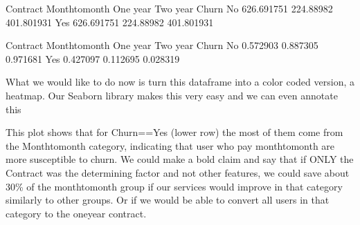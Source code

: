 \documentclass[letterpaper,10pt,english]{jupyterBook}
\begin{document}
\begin{sphinxVerbatim}[commandchars=\\\{\}]
Contract  Month\PYGZhy{}to\PYGZhy{}month   One year    Two year
Churn                                          
No           \PYGZhy{}626.691751  224.88982  401.801931
Yes           626.691751 \PYGZhy{}224.88982 \PYGZhy{}401.801931
\end{sphinxVerbatim}

\begin{sphinxVerbatim}[commandchars=\\\{\}]
\end{sphinxVerbatim}

\begin{sphinxVerbatim}[commandchars=\\\{\}]
Contract  Month\PYGZhy{}to\PYGZhy{}month  One year  Two year
Churn                                       
No              0.572903  0.887305  0.971681
Yes             0.427097  0.112695  0.028319
\end{sphinxVerbatim}

\sphinxAtStartPar
What we would like to do now is turn this dataframe into a color coded version, a heatmap. Our Seaborn library makes this very easy and we can even annotate this

\begin{sphinxVerbatim}[commandchars=\\\{\}]
   
\end{sphinxVerbatim}

\noindent{}

\sphinxAtStartPar
This plot shows that for Churn==Yes (lower row) the most of them come from the Month\sphinxhyphen{}to\sphinxhyphen{}month category, indicating that user who pay month\sphinxhyphen{}to\sphinxhyphen{}month are more susceptible to churn. We could make a bold claim and say that if ONLY the Contract was the determining factor and not other features, we could save about 30\% of the month\sphinxhyphen{}to\sphinxhyphen{}month group if our services would improve in that category similarly to other groups. Or if we would be able to convert all users in that category to the one\sphinxhyphen{}year contract.
\end{document}
